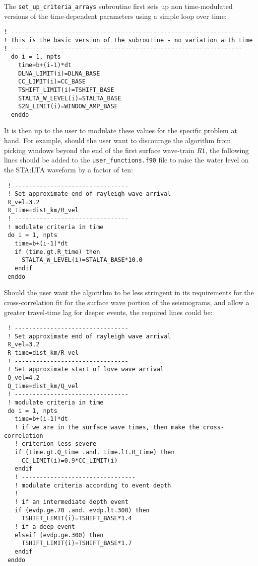 The {\tt set\_up\_criteria\_arrays} subroutine first sets up non time-modulated versions of the time-dependent parameters using a simple loop over time:
{\small
\begin{verbatim}
! -----------------------------------------------------------------
! This is the basic version of the subroutine - no variation with time
! -----------------------------------------------------------------
  do i = 1, npts
    time=b+(i-1)*dt
    DLNA_LIMIT(i)=DLNA_BASE
    CC_LIMIT(i)=CC_BASE
    TSHIFT_LIMIT(i)=TSHIFT_BASE
    STALTA_W_LEVEL(i)=STALTA_BASE
    S2N_LIMIT(i)=WINDOW_AMP_BASE
  enddo
\end{verbatim}
}
It is then up to the user to modulate these values for the specific problem at hand.  For example, should the user want to discourage the algorithm from picking windows beyond the end of the first surface wave-train $R1$, the following lines should be added to the {\tt user\_functions.f90} file to raise the water level on the STA:LTA waveform by a factor of ten:
{\small
\begin{verbatim}
 ! --------------------------------
 ! Set approximate end of rayleigh wave arrival
 R_vel=3.2
 R_time=dist_km/R_vel
 ! --------------------------------
 ! modulate criteria in time
 do i = 1, npts
   time=b+(i-1)*dt
   if (time.gt.R_time) then
     STALTA_W_LEVEL(i)=STALTA_BASE*10.0     
   endif
 enddo
\end{verbatim}
}
Should the user want the algorithm to be less stringent in its requirements for the cross-correlation fit for the surface wave portion of the seismograms, and allow a greater travel-time lag for deeper events, the required lines could be:
{\small
\begin{verbatim}
 ! --------------------------------
 ! Set approximate end of rayleigh wave arrival
 R_vel=3.2
 R_time=dist_km/R_vel
 ! --------------------------------
 ! Set approximate start of love wave arrival
 Q_vel=4.2
 Q_time=dist_km/Q_vel
 ! --------------------------------
 ! modulate criteria in time
 do i = 1, npts
   time=b+(i-1)*dt
   ! if we are in the surface wave times, then make the cross-correlation
   ! criterion less severe
   if (time.gt.Q_time .and. time.lt.R_time) then
     CC_LIMIT(i)=0.9*CC_LIMIT(i)
   endif
   ! --------------------------------
   ! modulate criteria according to event depth
   !
   ! if an intermediate depth event
   if (evdp.ge.70 .and. evdp.lt.300) then
     TSHIFT_LIMIT(i)=TSHIFT_BASE*1.4
   ! if a deep event
   elseif (evdp.ge.300) then
     TSHIFT_LIMIT(i)=TSHIFT_BASE*1.7
   endif
 enddo
 \end{verbatim}
}
